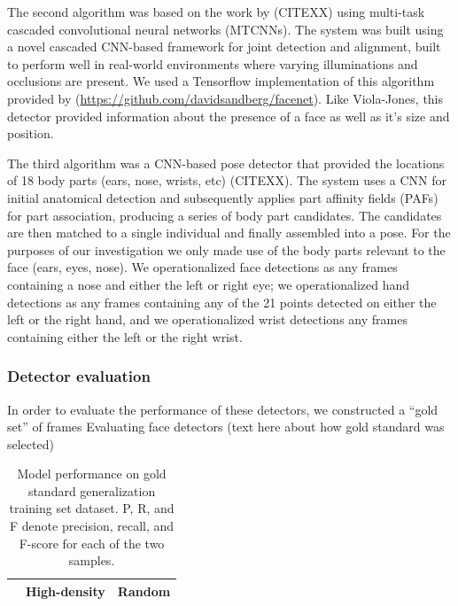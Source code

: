 \documentclass[10pt, letterpaper]{article}
\begin{document}
The second algorithm was based on the work by (CITEXX) using multi-task
cascaded convolutional neural networks (MTCNNs). The system was built
using a novel cascaded CNN-based framework for joint detection and
alignment, built to perform well in real-world environments where
varying illuminations and occlusions are present. We used a Tensorflow
implementation of this algorithm provided by
(\url{https://github.com/davidsandberg/facenet}). Like Viola-Jones, this
detector provided information about the presence of a face as well as
it's size and position.

The third algorithm was a CNN-based pose detector that provided the
locations of 18 body parts (ears, nose, wrists, etc) (CITEXX). The
system uses a CNN for initial anatomical detection and subsequently
applies part affinity fields (PAFs) for part association, producing a
series of body part candidates. The candidates are then matched to a
single individual and finally assembled into a pose. For the purposes of
our investigation we only made use of the body parts relevant to the
face (ears, eyes, nose). We operationalized face detections as any
frames containing a nose and either the left or right eye; we
operationalized hand detections as any frames containing any of the 21
points detected on either the left or the right hand, and we
operationalized wrist detections any frames containing either the left
or the right wrist.

\subsubsection{Detector evaluation}\label{detector-evaluation}

In order to evaluate the performance of these detectors, we constructed
a ``gold set'' of frames Evaluating face detectors (text here about how
gold standard was selected)

\begin{table}[t]
  \caption{Model performance on gold standard generalization training set dataset. P, R, and F denote precision, recall, and F-score for each of the two samples. \label{tab:model_eval}}
  \begin{center}
    \begin{tabular}{l|ccc|ccc}
      \hline
       &  \multicolumn{3}{c|}{High-density} &  \multicolumn{3}{c}{Random} \\
      \hline
    \hline
    \end{tabular}
  \end{center}
\end{table}
\end{document}
